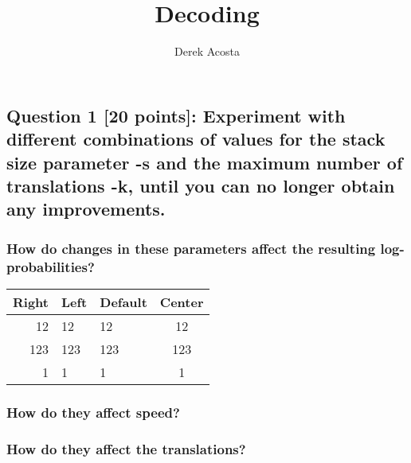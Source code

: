 \documentclass[]{article}
\title{Decoding}
\author{Derek Acosta}
\date{}
\begin{document}
\maketitle

\hypertarget{question-1-20-points-experiment-with-different-combinations-of-values-for-the-stack-size-parameter--s-and-the-maximum-number-of-translations--k-until-you-can-no-longer-obtain-any-improvements.}{%
\subsection{Question 1 {[}20 points{]}: Experiment with different
combinations of values for the stack size parameter -s and the maximum
number of translations -k, until you can no longer obtain any
improvements.}\label{question-1-20-points-experiment-with-different-combinations-of-values-for-the-stack-size-parameter--s-and-the-maximum-number-of-translations--k-until-you-can-no-longer-obtain-any-improvements.}}

\hypertarget{how-do-changes-in-these-parameters-affect-the-resulting-log-probabilities}{%
\subsubsection{How do changes in these parameters affect the resulting
log-probabilities?}\label{how-do-changes-in-these-parameters-affect-the-resulting-log-probabilities}}

\begin{longtable}[]{@{}rllc@{}}
\toprule
Right & Left & Default & Center\tabularnewline
\midrule
\endhead
12 & 12 & 12 & 12\tabularnewline
123 & 123 & 123 & 123\tabularnewline
1 & 1 & 1 & 1\tabularnewline
\bottomrule
\end{longtable}

\hypertarget{how-do-they-affect-speed}{%
\subsubsection{How do they affect
speed?}\label{how-do-they-affect-speed}}

\hypertarget{how-do-they-affect-the-translations}{%
\subsubsection{How do they affect the
translations?}\label{how-do-they-affect-the-translations}}
\end{document}
